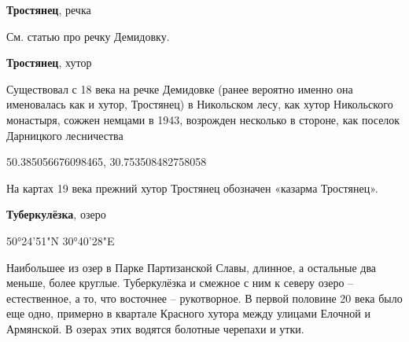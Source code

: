 \medskip

\textbf{Тростянец}, речка

См. статью про речку Демидовку.\\
\medskip


\textbf{Тростянец}, хутор

Существовал с 18 века на речке Демидовке (ранее вероятно именно она именовалась как и хутор, Тростянец) в Никольском лесу, как хутор Никольского монастыря, сожжен немцами в 1943, возрожден несколько в стороне, как поселок Дарницкого лесничества

50.385056676098465, 30.753508482758058

На картах 19 века прежний хутор Тростянец обозначен «казарма Тростянец».\\

\medskip



\textbf{Туберкулёзка}, озеро 

50°24'51"N 30°40'28"E

Наибольшее из озер в Парке Партизанской Славы, длинное, а остальные два меньше, более круглые. Туберкулёзка и смежное с ним к северу озеро – естественное, а то, что восточнее – рукотворное. В первой половине 20 века было еще одно, примерно в квартале Красного хутора между улицами Елочной и Армянской. В озерах этих водятся болотные черепахи и утки.
